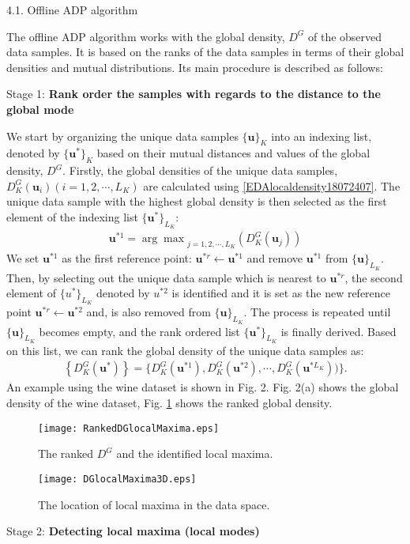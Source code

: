 4.1. Offline ADP algorithm

The offline ADP algorithm works with the global density, $D^G$ of the observed data samples. It is based on the ranks of the data samples in terms of their global densities and mutual distributions. Its main procedure is described as follows:

Stage 1: \textbf{Rank order the samples with regards to the distance to the global mode}

We start by organizing the unique data samples $\{\bm u\}_K$ into an indexing list, denoted by $\{\bm u^*\}_K$ based on their mutual distances and values of the global density, $D^G$.
Firstly, the global densities of the unique data samples, $D^G_K(\bm u_i) (i = 1, 2, \cdots, L_K)$ are calculated using \eqref{EDAlocaldensity18072407}. The unique data sample with the highest global density is then selected as the first element of the indexing list $\{\bm u^*\}_{L_K}$:
\begin{align}\label{EDAlocaldensity18072408}
 \bm u^{*1} = {\arg \max}_{j=1,2,\cdots,L_K} \left(D^G_K(\bm u_j)\right)
\end{align}
We set $\bm u^{*1}$ as the first reference point: $\bm u^{*r} \leftarrow \bm u^{*1}$ and remove $ \bm u^{*1}$ from $\{\bm u\}_{L_K}$. Then, by selecting out the unique data
sample which is nearest to $\bm u^{*r}$, the second element of $\{u^*\}_{L_K}$ denoted by $u^{*2}$ is identified and it is set as the new reference point $\bm u^{*r} \leftarrow \bm u^{*2}$ and, is also removed from $\{\bm u\}_{L_K}$. The process is repeated until $\{\bm u\}_{L_K}$ becomes empty, and the rank ordered list $\{\bm u^*\}_{L_K}$ is finally derived. Based on this list, we can rank the global density of the unique data samples as:
\begin{align}\label{EDAlocaldensity18072409}
 \left\{D^G_K(\bm u^*)\right\} =\{D^G_K(\bm u^{*1}),D^G_K(\bm u^{*2}),\cdots, D^G_K(\bm u^{*L_K}) )\} .
\end{align}
An example using the wine dataset \cite{AeberhardWinedata1992} is shown in Fig. 2. Fig. 2(a) shows the global density of the wine dataset, Fig. \ref{RankedDGlocalMaxima0726}
shows the ranked global density.
\begin{figure}[H]
\centering
  \texttt{[image: RankedDGlocalMaxima.eps]}
  \caption{The ranked $D^G$ and the identified local maxima.}
  \label{RankedDGlocalMaxima0726}
\end{figure}
\begin{figure}[H]
\centering
  \texttt{[image: DGlocalMaxima3D.eps]}
  \caption{The location of local maxima in the data space.}
  \label{DGlocalMaxima3D0726}
\end{figure}
Stage 2: \textbf{Detecting local maxima (local modes)}

